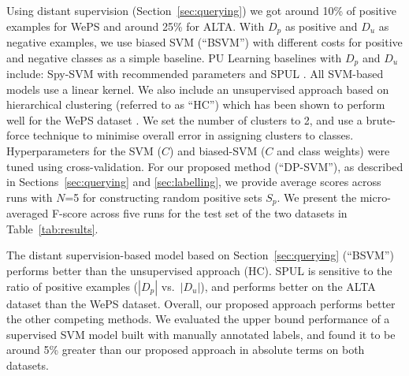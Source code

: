 \documentclass[letterpaper]{sig-alternate-2013}
\newcommand{\tabref}[1]{Table~\ref{#1}\xspace}
\newcommand{\secref}[2][]{Section#1~\ref{#2}\xspace}
\begin{document}
Using distant supervision (\secref{sec:querying}) we got around 10\% of positive examples for WePS and around 25\% for ALTA. With $D_{p}$ as positive and $D_{u}$ as negative examples, we use biased SVM (``BSVM'') with different costs for positive and negative classes as a simple baseline. PU Learning baselines with $D_{p}$ and $D_{u}$ include: Spy-SVM with recommended parameters \cite{liu2002partially} and SPUL \cite{Elkan:2008:LCO:1401890.1401920}. All SVM-based models use a linear kernel. We also include an unsupervised approach based on  hierarchical clustering (referred to as ``HC'') which has been shown to perform well for the WePS dataset \cite{delgado2014data}. We set the number of clusters to 2, and use a brute-force technique to minimise overall error in assigning clusters to classes.
Hyperparameters for the SVM ($C$) and biased-SVM ($C$ and class weights) were tuned using cross-validation. For our proposed method (``DP-SVM''), as described in \secref[s]{sec:querying} and \ref{sec:labelling}, we provide average scores across runs with $N$=5 for constructing random positive sets $S_{p}$. We present the micro-averaged F-score across five runs for the test set of the two datasets in \tabref{tab:results}. 

The distant supervision-based model based on \secref{sec:querying} (``BSVM'') performs better than the unsupervised approach (HC). SPUL is sensitive to the ratio of positive examples ($|D_{p}|$ vs.\ $|D_{u}|$), and performs better on the ALTA dataset than the WePS dataset. Overall, our proposed approach performs better the other competing methods. We evaluated the upper bound performance of a supervised SVM model built with manually annotated labels, and found it to be around 5\% greater than our proposed approach in absolute terms on both datasets.
\end{document}
